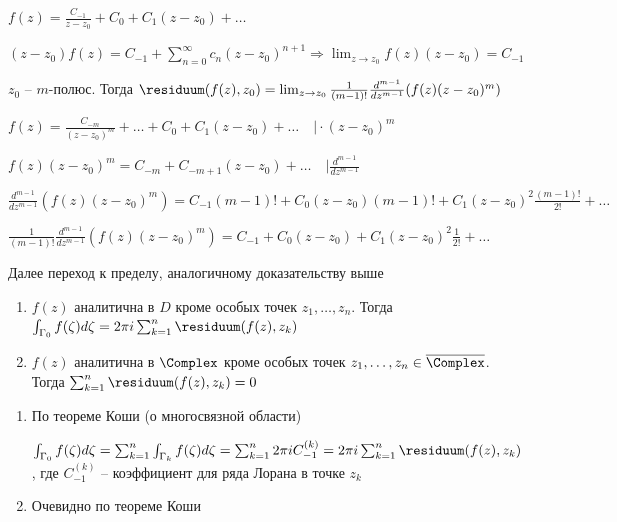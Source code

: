 \documentclass[12pt]{article}
\begin{document}
\begin{MyProof}
    $f(z) = \frac{C_{-1}}{z - z_0} + C_0 + C_1 (z - z_0) + \dots$

    $(z - z_0) f(z) = C_{-1} + \sum_{n = 0}^\infty c_n (z - z_0)^{n + 1} \Longrightarrow \lim_{z \to z_0} f(z) (z - z_0) = C_{-1}$
\end{MyProof}

\begin{MyTheorem}
    \Ths $z_0$ -- $m$-полюс. Тогда $\residuum(f(z), z_0) = \lim_{z \to z_0} \frac{1}{(m - 1)!} \frac{d^{m - 1}}{dz^{m - 1}} (f(z) (z - z_0)^m)$
\end{MyTheorem}

\begin{MyProof}
    $f(z) = \frac{C_{-m}}{(z - z_0)^m} + \dots + C_0 + C_1 (z - z_0) + \dots \quad \Big| \cdot (z - z_0)^m$

    $f(z) (z - z_0)^m = C_{-m} + C_{-m+1} (z - z_0) + \dots  \quad \Big| \frac{d^{m - 1}}{dz^{m - 1}}$

    $\frac{d^{m - 1}}{dz^{m - 1}} (f(z) (z - z_0)^m) = C_{-1} (m - 1)! + C_0 (z - z_0) (m - 1)! + C_1 (z - z_0)^2 \frac{(m - 1)!}{2!} + \dots$

    $\frac{1}{(m - 1)!} \frac{d^{m - 1}}{dz^{m - 1}} (f(z) (z - z_0)^m) = C_{-1} + C_0 (z - z_0) + C_1 (z - z_0)^2 \frac{1}{2!} + \dots$

    Далее переход к пределу, аналогичному доказательству выше
\end{MyProof}

\begin{MyTheorem}

    \begin{enumerate}
        \item $f(z)$ аналитична в $D$ кроме особых точек $z_1, \dots, z_n$. Тогда $\int_{\Gamma_0} f(\zeta) d\zeta = 2\pi i \sum_{k = 1}^n \residuum(f(z), z_k)$

        \item $f(z)$ аналитична в $\Complex$ кроме особых точек $z_1, \dots, z_n \in \overline{\Complex}$. Тогда $\sum_{k = 1}^n \residuum(f(z), z_k) = 0$
    \end{enumerate}
\end{MyTheorem}

\begin{MyProof}
    \begin{enumerate}
        \item По теореме Коши (о многосвязной области)

        $\int_{\Gamma_0} f(\zeta) d\zeta = \sum_{k = 1}^n \int_{\Gamma_k} f(\zeta) d\zeta = \sum_{k = 1}^n 2 \pi i C^{(k)}_{-1} = 2 \pi i \sum_{k = 1}^n \residuum(f(z), z_k)$, где $C^{(k)}_{-1}$ -- коэффициент для ряда Лорана в точке $z_k$

        \item Очевидно по теореме Коши
    \end{enumerate}
\end{MyProof}
\end{document}

